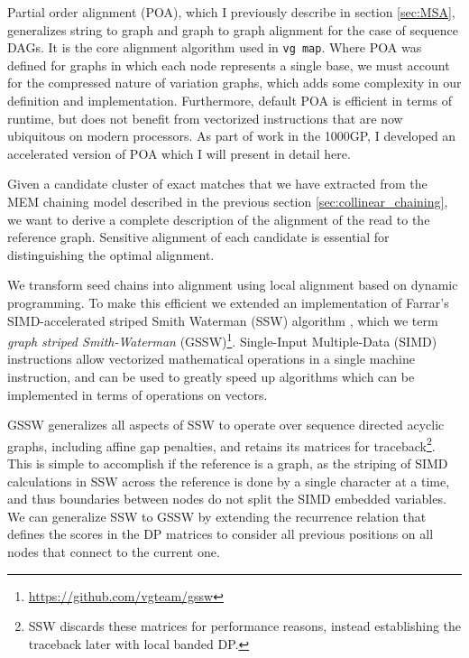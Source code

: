 Partial order alignment (POA), which I previously describe in section \ref{sec:MSA}, generalizes string to graph and graph to graph alignment for the case of sequence DAGs.
It is the core alignment algorithm used in {\tt vg map}.
Where POA was defined for graphs in which each node represents a single base, we must account for the compressed nature of variation graphs, which adds some complexity in our definition and implementation.
Furthermore, default POA is efficient in terms of runtime, but does not benefit from vectorized instructions that are now ubiquitous on modern processors.
As part of work in the 1000GP, I developed an accelerated version of POA which I will present in detail here.

Given a candidate cluster of exact matches that we have extracted from the MEM chaining model described in the previous section \ref{sec:collinear_chaining}, we want to derive a complete description of the alignment of the read to the reference graph.
Sensitive alignment of each candidate is essential for distinguishing the optimal alignment.

We transform seed chains into alignment using local alignment based on dynamic programming. 
To make this efficient we extended an implementation \cite{zhao2013ssw} of Farrar's SIMD-accelerated striped Smith Waterman (SSW) algorithm \cite{farrar2007striped}, which we term \emph{graph striped Smith-Waterman} (GSSW)\footnote{\url{https://github.com/vgteam/gssw}}.
Single-Input Multiple-Data (SIMD) instructions allow vectorized mathematical operations in a single machine instruction, and can be used to greatly speed up algorithms which can be implemented in terms of operations on vectors.

GSSW generalizes all aspects of SSW to operate over sequence directed acyclic graphs, including affine gap penalties, and retains its matrices for traceback\footnote{SSW discards these matrices for performance reasons, instead establishing the traceback later with local banded DP.}.
This is simple to accomplish if the reference is a graph, as the striping of SIMD calculations in SSW across the reference is done by a single character at a time, and thus boundaries between nodes do not split the SIMD embedded variables.
We can generalize SSW to GSSW by extending the recurrence relation that defines the scores in the DP matrices to consider all previous positions on all nodes that connect to the current one.

